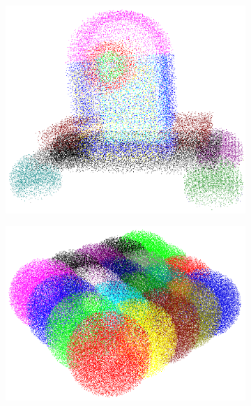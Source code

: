 \begin{figure}
	\centering
	\begin{subfigure}[b]{0.21\linewidth}
		\centering
		\includegraphics[width=\textwidth]{figures/m0_pc.png}
	\end{subfigure}	 
	\begin{subfigure}[b]{0.21\linewidth}
		\centering
		\includegraphics[width=\textwidth]{figures/m2_pc.png}
	\end{subfigure}	
	\begin{subfigure}[b]{0.21\linewidth}
		\centering

\end{subfigure}
\end{figure}
